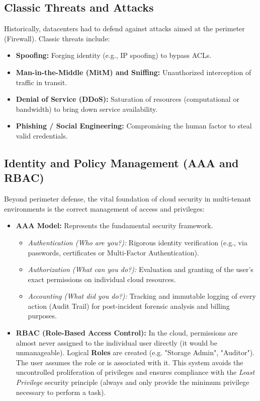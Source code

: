 \subsection{Classic Threats and Attacks}
Historically, datacenters had to defend against attacks aimed at the perimeter (Firewall). Classic threats include:
\begin{itemize}
    \item \textbf{Spoofing:} Forging identity (e.g., IP spoofing) to bypass ACLs.
    \item \textbf{Man-in-the-Middle (MitM) and Sniffing:} Unauthorized interception of traffic in transit.
    \item \textbf{Denial of Service (DDoS):} Saturation of resources (computational or bandwidth) to bring down service availability.
    \item \textbf{Phishing / Social Engineering:} Compromising the human factor to steal valid credentials.
\end{itemize}

\subsection{Identity and Policy Management (AAA and RBAC)}
Beyond perimeter defense, the vital foundation of cloud security in multi-tenant environments is the correct management of access and privileges:
\begin{itemize}
    \item \textbf{AAA Model:} Represents the fundamental security framework.
    \begin{itemize}
        \item \textit{Authentication (Who are you?):} Rigorous identity verification (e.g., via passwords, certificates or Multi-Factor Authentication).
        \item \textit{Authorization (What can you do?):} Evaluation and granting of the user's exact permissions on individual cloud resources.
        \item \textit{Accounting (What did you do?):} Tracking and immutable logging of every action (Audit Trail) for post-incident forensic analysis and billing purposes.
    \end{itemize}
    \item \textbf{RBAC (Role-Based Access Control):} In the cloud, permissions are almost never assigned to the individual user directly (it would be unmanageable). Logical \textbf{Roles} are created (e.g. "Storage Admin", "Auditor"). The user assumes the role or is associated with it. This system avoids the uncontrolled proliferation of privileges and ensures compliance with the \textit{Least Privilege} security principle (always and only provide the minimum privilege necessary to perform a task).
\end{itemize}

